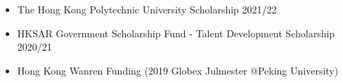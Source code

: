 \begin{itemize}
  \item The Hong Kong Polytechnic University Scholarship 2021/22
  \item HKSAR Government Scholarship Fund - Talent Development Scholarship 2020/21
  \item Hong Kong Wanren Funding (2019 Globex Julmester @Peking University)
\end{itemize}
